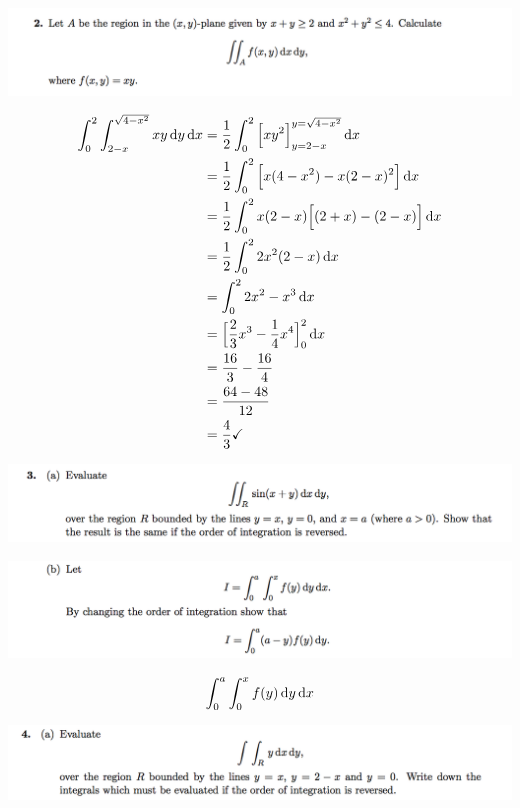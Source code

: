 \documentclass[12pt]{article}
\begin{document}
\newpage
\begin{mdframed}
\includegraphics[width=400pt]{img/oxford-prelims-M5-multivariable-calc-1-2.png}
\end{mdframed}
\begin{align*}
     \int_0^2 \int_{2 - x}^{\sqrt{4 - x^2}} xy \dy \dx
  &= \frac{1}{2}\int_0^2 \Big[xy^2\Big]_{y=2 - x}^{y=\sqrt{4 - x^2}} \dx\\
  &= \frac{1}{2}\int_0^2 \Big[x(4 - x^2) - x(2 - x)^2\Big] \dx\\
  &= \frac{1}{2}\int_0^2 x(2-x)\Big[(2 + x) - (2 - x)\Big] \dx\\
  &= \frac{1}{2}\int_0^2 2x^2(2-x) \dx\\
  &= \int_0^2 2x^2 - x^3 \dx\\
  &= \Big[\frac{2}{3}x^3 - \frac{1}{4}x^4\Big]_0^2 \dx\\
  &= \frac{16}{3} - \frac{16}{4}\\
  &= \frac{64 - 48}{12}\\
  &= \frac{4}{3} \checkmark
\end{align*}


\newpage
\begin{mdframed}
\includegraphics[width=400pt]{img/oxford-prelims-M5-multivariable-calc-1-3-a.png}
\end{mdframed}

\newpage
\begin{mdframed}
\includegraphics[width=400pt]{img/oxford-prelims-M5-multivariable-calc-1-3-b.png}
\end{mdframed}
\begin{align*}
  \int_0^a\int_0^x f(y) \dy \dx
\end{align*}
\newpage
\begin{mdframed}
\includegraphics[width=400pt]{img/oxford-prelims-M5-multivariable-calc-1-4-a.png}
\end{mdframed}
\end{document}
